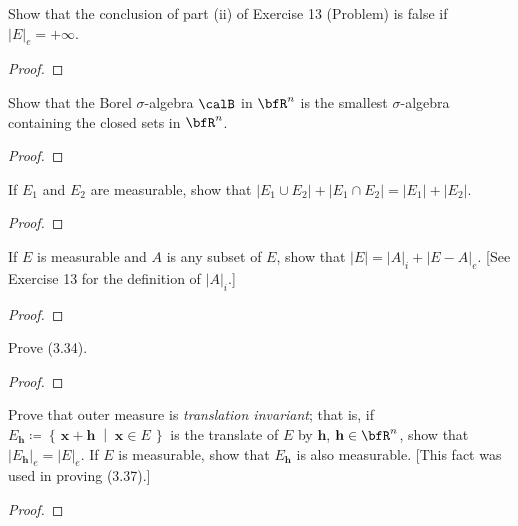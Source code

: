\begin{problem}
Show that the conclusion of part  (ii) of Exercise 13 (Problem) is false if
$\left|E\right|_e=+\infty$.
\end{problem}
\begin{proof}
\end{proof}
\newpage

\begin{problem}
Show that the Borel $\sigma$-algebra $\calB$ in $\bfR^n$ is the smallest
$\sigma$-algebra containing the closed sets in $\bfR^n$.
\end{problem}
\begin{proof}
\end{proof}
\newpage

\begin{problem}
If $E_1$ and $E_2$ are measurable, show that $\left|E_1\cup
  E_2\right|+\left|E_1\cap E_2\right|=\left|E_1\right|+\left|E_2\right|$.
\end{problem}
\begin{proof}
\end{proof}
\newpage

\begin{problem}
If $E$ is measurable and $A$ is any subset of $E$, show that
$\left|E\right|=\left|A\right|_i+\left|E\minus A\right|_e$. [See Exercise
13 for the definition of $\left|A\right|_i$.]
\end{problem}
\begin{proof}
\end{proof}
\newpage

\begin{problem}
Prove (3.34).
\end{problem}
\begin{proof}
\end{proof}
\newpage

\begin{problem}
Prove that outer measure is \emph{translation invariant}; that is, if
$E_{\textbf{h}}\coloneqq\left\{\,\mathbf{x}+\mathbf{h}\;\middle|\;\mathbf{x}\in
  E\,\right\}$ is the translate of $E$ by $\mathbf{h}$,
$\mathbf{h}\in\bfR^n$, show that
$\left|E_{\mathbf{h}}\right|_e=\left|E\right|_e$. If $E$ is measurable,
show that $E_{\mathbf{h}}$ is also measurable. [This fact was used in
proving (3.37).]
\end{problem}
\begin{proof}
\end{proof}

